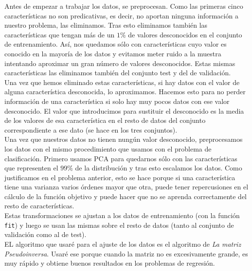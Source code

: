 \documentclass{article}
\begin{document}
Antes de empezar a trabajar los datos, se preprocesan. Como las primeras cinco características no son predicativas, es decir, no aportan ninguna información a nuestro problema, las eliminamos. Tras esto eliminamos también las características que tengan más de un $1\%$ de valores desconocidos en el conjunto de entrenamiento. Así, nos quedamos sólo con características cuyo valor es conocido en la mayoría de los datos y evitamos meter ruido a la muestra intentando aproximar un gran número de valores desconocidos. Estas mismas características las eliminamos también del conjunto test y del de validación.\\
Una vez que hemos eliminado estas características, si hay datos con el valor de alguna característica desconocida, lo aproximamos. Hacemos esto para no perder información de una característica si solo hay muy pocos datos con ese valor desconocido. El valor que introducimos para sustituir el desconocido es la media de los valores de esa característica en el resto de datos del conjunto correspondiente a ese dato (se hace en los tres conjuntos).\\

Una vez que nuestros datos no tienen nungún valor desconocido, preprocesamos los datos con el mismo procedimiento que usamos con el problema de clasificación. Primero usamos PCA para quedarnos sólo con las características que representen el $99\%$ de la distribución y tras esto escalamos los datos. Como justificamos en el problema anterior, esto se hace porque si una característica tiene una varianza varios órdenes mayor que otra, puede tener repercusiones en el cálculo de la función objetivo y puede hacer que no se aprenda correctamente del resto de características.\\
Estas transformaciones se ajustan a los datos de entrenamiento (con la función \texttt{fit}) y luego se usan las mismas sobre el resto de datos (tanto al conjunto de validación como al de test).\\

EL algoritmo que usaré para el ajuste de los datos es el algoritmo de \textit{La matriz Pseudoinversa}. Usaré ese porque cuando la matriz no es excesivamente grande, es muy rápido y obtiene buenos resultados en los problemas de regresión.
\end{document}
